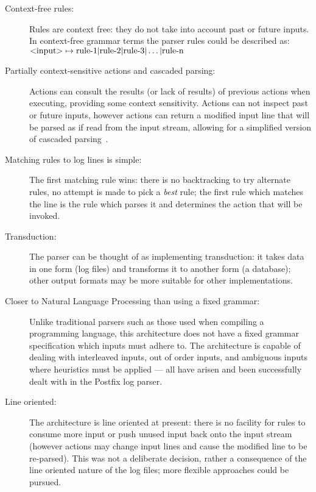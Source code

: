 \documentclass[draft]{svmult}
\begin{document}
\begin{description}

    \item [Context-free rules:]  Rules are context free: they do not take
        into account past or future inputs.  In context-free
        grammar terms the parser rules could be described as:
        $\text{\textless{}input\textgreater{}} \mapsto \text{rule-1} |
        \text{rule-2} | \text{rule-3} | \dots | \text{rule-n}$

    \item [Partially context-sensitive actions and cascaded parsing:]
        Actions can consult the results (or lack of results) of previous
        actions when executing, providing some context sensitivity.
        Actions can not inspect past or future inputs, however actions
        can return a modified input line that will be parsed as if read
        from the input stream, allowing for a simplified version of
        cascaded parsing~\cite{cascaded-parsing}.

    \item [Matching rules to log lines is simple:]  The first matching rule
        wins: there is no backtracking to try alternate rules, no attempt
        is made to pick a \textit{best\/} rule; the first rule which
        matches the line is the rule which parses it and determines the
        action that will be invoked.

    \item [Transduction:]  The parser can be thought of as implementing
        transduction: it takes data in one form (log files) and transforms
        it to another form (a database); other output formats may be more
        suitable for other implementations.

    \item [Closer to Natural Language Processing than using a fixed
        grammar:] Unlike traditional parsers such as those used when
        compiling a programming language, this architecture does not have a
        fixed grammar specification which inputs must adhere to.  The
        architecture is capable of dealing with interleaved inputs, out of
        order inputs, and ambiguous inputs where heuristics must be applied
        --- all have arisen and been successfully dealt with in the Postfix
        log parser.

    \item [Line oriented:]  The architecture is line oriented at present:
        there is no facility for rules to consume more input or push unused
        input back onto the input stream (however actions may change input
        lines and cause the modified line to be re-parsed).  This was not a
        deliberate decision, rather a consequence of the line oriented
        nature of the log files; more flexible approaches could be pursued.

\end{description}
\end{document}
